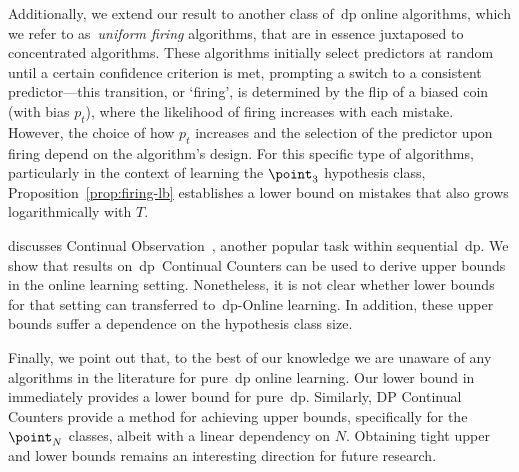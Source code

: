 Additionally, we extend our result to another class of~\Gls{dp} online algorithms, which we refer to as~\emph{uniform firing} algorithms, that are in essence juxtaposed to concentrated algorithms.  These algorithms initially select predictors at random until a certain
confidence criterion is met, prompting a switch to a consistent predictor—this transition, or `firing', is determined by the flip of a biased coin (with bias \(p_t\)), where the likelihood of firing increases with each mistake. However, the choice of how \(p_t\) increases and the selection of the predictor upon firing depend on the algorithm's design. For this specific type of algorithms, particularly in the context of learning the \(\point_3\) hypothesis class, Proposition~\ref{prop:firing-lb} establishes a lower bound on mistakes that also grows logarithmically with \(T\).


 discusses Continual Observation~\citep{dwork2010boosting,chan2011private}, another popular task within sequential~\Gls{dp}. We show that results on~\Gls{dp}~Continual Counters can be used to derive upper bounds in the online learning setting. Nonetheless, it is not clear whether lower bounds for that setting can transferred to~\Gls{dp}-Online learning. In addition, these upper bounds suffer a dependence on the hypothesis class size. 

Finally, we point out that, to the best of our knowledge we are unaware of any algorithms in the literature for pure~\Gls{dp} online learning. Our lower bound in~ immediately provides a lower bound for pure~\Gls{dp}. Similarly, DP Continual Counters provide a method for achieving upper bounds, specifically for the \(\point_N\) classes, albeit with a linear dependency on \(N\). Obtaining tight upper and lower bounds remains an interesting direction for future research.
